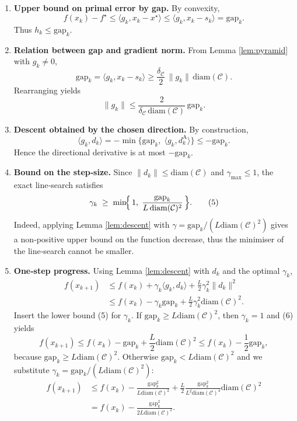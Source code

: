 \documentclass{article}
\newcommand{\C}{\mathcal{C}}
\newcommand{\gap}{\mathrm{gap}}
\newcommand{\diam}{\mathrm{diam}}
\begin{document}
\begin{enumerate}[label=[Step \arabic*],leftmargin=*]
\item \textbf{Upper bound on primal error by gap.}  
By convexity,
\[
f(x_{k})-f^{\star}\le \langle g_{k},x_{k}-x^{\star}\rangle
\le \langle g_{k},x_{k}-s_{k}\rangle = \gap_{k}.
\tag{1}
\]
Thus $h_{k}\le\gap_{k}$.

\item \textbf{Relation between gap and gradient norm.}  
From Lemma \ref{lem:pyramid} with $g_{k}\neq0$,
\[
\gap_{k}
= \langle g_{k},x_{k}-s_{k}\rangle
\ge \frac{\delta_{\C}}{2}\,\|g_{k}\|\,\diam(\C).
\tag{2}
\]
Rearranging yields
\[
\|g_{k}\|\le \frac{2}{\delta_{\C}\,\diam(\C)}\,\gap_{k}.
\tag{3}
\]

\item \textbf{Descent obtained by the chosen direction.}  
By construction,
\[
\langle g_{k},d_{k}\rangle = -\min\bigl\{\gap_{k},\;\langle g_{k},d^{\text{A}}_{k}\rangle\bigr\}
\le -\gap_{k}.
\tag{4}
\]
Hence the directional derivative is at most $-\gap_{k}$.

\item \textbf{Bound on the step‑size.}  
Since $\|d_{k}\|\le \diam(\C)$ and $\gamma_{\max}\le1$, the exact line‑search satisfies
\[
\gamma_{k}\;\ge\;
\min\!\Bigl\{\,1,\;\frac{\gap_{k}}{L\,\diam(\C)^{2}}\,\Bigr\}.
\tag{5}
\]
Indeed, applying Lemma \ref{lem:descent} with $\gamma= \gap_{k}/(L\diam(\C)^{2})$ gives a non‑positive upper bound on the function decrease, thus the minimiser of the line‑search cannot be smaller.

\item \textbf{One‑step progress.}  
Using Lemma \ref{lem:descent} with $d_{k}$ and the optimal $\gamma_{k}$,
\[
\begin{aligned}
f(x_{k+1})
&\le f(x_{k})+\gamma_{k}\langle g_{k},d_{k}\rangle
   +\frac{L}{2}\gamma_{k}^{2}\|d_{k}\|^{2}\\
&\le f(x_{k})-\gamma_{k}\gap_{k}
   +\frac{L}{2}\gamma_{k}^{2}\diam(\C)^{2}.
\end{aligned}
\tag{6}
\]
Insert the lower bound (5) for $\gamma_{k}$.
If $\gap_{k}\ge L\diam(\C)^{2}$, then $\gamma_{k}=1$ and (6) yields
\[
f(x_{k+1})\le f(x_{k})-\gap_{k}+\frac{L}{2}\diam(\C)^{2}
\le f(x_{k})-\frac{1}{2}\gap_{k},
\]
because $\gap_{k}\ge L\diam(\C)^{2}$.
Otherwise $\gap_{k}< L\diam(\C)^{2}$ and we substitute $\gamma_{k}= \gap_{k}/(L\diam(\C)^{2})$:
\[
\begin{aligned}
f(x_{k+1})
&\le f(x_{k})-\frac{\gap_{k}^{2}}{L\diam(\C)^{2}}
   +\frac{L}{2}\frac{\gap_{k}^{2}}{L^{2}\diam(\C)^{4}}\diam(\C)^{2}\\
&= f(x_{k})-\frac{\gap_{k}^{2}}{2L\diam(\C)^{2}}.
\end{aligned}
\tag{7}
\]


\end{enumerate}
\end{document}
